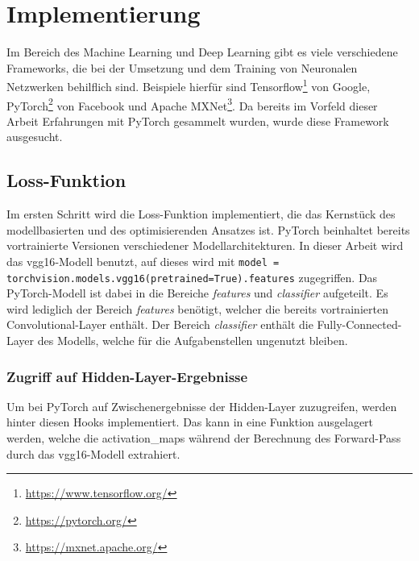 \chapter{Implementierung}
\label{cha:implementation}

Im Bereich des Machine Learning und Deep Learning gibt es viele verschiedene Frameworks, die bei der Umsetzung und dem Training von Neuronalen Netzwerken behilflich sind. Beispiele hierfür sind Tensorflow\footnote{\url{https://www.tensorflow.org/}} von Google, PyTorch\footnote{\url{https://pytorch.org/}} von Facebook und Apache MXNet\footnote{\url{https://mxnet.apache.org/}}. Da bereits im Vorfeld dieser Arbeit Erfahrungen mit PyTorch gesammelt wurden, wurde diese Framework ausgesucht.

\section{Loss-Funktion}

Im ersten Schritt wird die Loss-Funktion implementiert, die das Kernstück des modellbasierten und des optimisierenden Ansatzes ist.
PyTorch beinhaltet bereits vortrainierte Versionen verschiedener Modellarchitekturen. In dieser Arbeit wird das \gls{vgg16}-Modell benutzt, auf dieses wird mit \texttt{model = torchvision.models.vgg16(pretrained=True).features} zugegriffen. Das PyTorch-Modell ist dabei in die Bereiche \textit{features} und \textit{classifier} aufgeteilt. Es wird lediglich der Bereich \textit{features} benötigt, welcher die bereits vortrainierten Convolutional-Layer enthält. Der Bereich \textit{classifier} enthält die Fully-Connected-Layer des Modells, welche für die Aufgabenstellen ungenutzt bleiben.

\pagebreak

\subsection{Zugriff auf Hidden-Layer-Ergebnisse}

Um bei PyTorch auf Zwischenergebnisse der Hidden-Layer zuzugreifen, werden hinter diesen Hooks implementiert. Das kann in eine Funktion ausgelagert werden, welche die \gls{activation_map}s während der Berechnung des Forward-Pass durch das \gls{vgg16}-Modell extrahiert.

